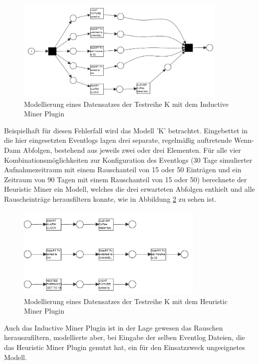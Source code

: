 \begin{figure}[!ht]
    \centering
    \includegraphics[width=0.9\textwidth,]{figures/Appbildungen/K_inductive_erronousPNG.PNG}
    \caption{Modellierung eines Datensatzes der Testreihe K mit dem Inductive Miner Plugin}
    \label{fig:K_inductive}
\end{figure}
Beispielhaft für diesen Fehlerfall wird das Modell 'K' betrachtet. Eingebettet in die hier eingesetzten Eventlogs lagen drei separate, regelmäßig auftretende Wenn-Dann Abfolgen, bestehend aus jeweils zwei oder drei Elementen. 
Für alle vier Kombinationsmöglichkeiten zur Konfiguration des Eventlogs (30 Tage simulierter Aufnahmezeitraum mit einem Rauschanteil von 15 oder 50 Einträgen und ein Zeitraum von  90 Tagen mit einem Rauschanteil von 15 oder 50) berechnete der Heuristic Miner ein Modell, welches die drei erwarteten Abfolgen enthielt und alle Rauscheinträge herausfiltern konnte, wie in Abbildung \ref{fig:K_heuristic} zu sehen ist.
\begin{figure}[!h]
    \centering
    \includegraphics[width=0.8\textwidth,]{figures/Appbildungen/K_heuristic_correct.PNG}
    \caption{Modellierung eines Datensatzes der Testreihe K mit dem Heuristic Miner Plugin}
    \label{fig:K_heuristic}
\end{figure}
Auch das Inductive Miner Plugin ist in der Lage gewesen das Rauschen herauszufiltern, modellierte aber, bei Eingabe der selben Eventlog Dateien, die das Heuristic Miner Plugin genutzt hat, ein für den Einsatzzweck ungeeignetes Modell. 

